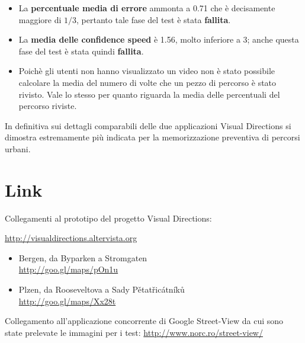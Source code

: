 \documentclass[12pt,a4paper,openright, notitlepage]{report}
\begin{document}
\begin{itemize}
	\item La \textbf{percentuale media di errore} ammonta a 0.71 che è decisamente maggiore di $1/3$, pertanto tale fase del test è stata \textbf{fallita}.
	\item La \textbf{media delle confidence speed} è 1.56, molto inferiore a 3; anche questa fase del test è stata quindi \textbf{fallita}.
	\item Poichè gli utenti non hanno visualizzato un video non è stato possibile calcolare la media del numero di volte che un pezzo di percorso è stato rivisto. Vale lo stesso per quanto riguarda la media delle percentuali del percorso riviste.
\end{itemize}

In definitiva sui dettagli comparabili delle due applicazioni Visual Directions si dimostra estremamente più indicata per la memorizzazione preventiva di percorsi urbani.

\appendix

\chapter{Link}

Collegamenti al prototipo del progetto Visual Directions: 

\url{http://visualdirections.altervista.org}

\begin{itemize}
	\item Bergen, da Byparken a Stromgaten \\
	\url{http://goo.gl/maps/pOn1u}

	\item Plzen, da Rooseveltova a Sady Pětatřicátníků \\
	\url{http://goo.gl/maps/Xx28t}
\end{itemize}

Collegamento all’applicazione concorrente di Google Street-View da cui sono state prelevate le immagini per i test: \url{http://www.norc.ro/street-view/}




\nocite{*}

\end{document}
